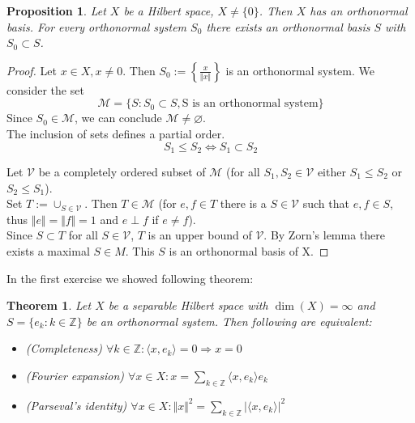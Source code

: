 \documentclass[a4paper, 11pt]{scrreprt}
\newtheorem{prop}[defi]{Proposition}
\newtheorem{theorem}[defi]{Theorem}
\newcommand{\ZZ}{\mathbb{Z}}
\newcommand{\student}[1]{\marginnote{{\normalfont\bf #1}}}
\begin{document}
\student{Dominik}
\begin{prop}
Let $X$ be a Hilbert space, $X \neq \{0\}$. Then $X$ has an orthonormal basis. For every orthonormal system $S_0$ there exists an orthonormal basis $S$ with $S_0 \subset S$.
\end{prop}
\begin{proof}
Let $x \in X, x \neq 0$. Then $S_0 := \left\{ \frac{x}{\Vert x \Vert} \right\}$ is an orthonormal system. We consider the set
\[\mathcal{M} = \{ S: S_0 \subset S, \text{S is an orthonormal system} \}\]
Since $S_0 \in \mathcal{M}$, we can conclude $\mathcal{M} \neq \varnothing$.\\
The inclusion of sets defines a partial order.
\[S_1 \leq S_2 \Leftrightarrow S_1 \subset S_2\]

Let $\mathcal{V}$ be a completely ordered subset of $\mathcal{M}$ (for all $S_1,S_2 \in \mathcal{V}$ either $S_1 \leq S_2$ or $S_2 \leq S_1$).\\
Set $T:= \cup_{S \in \mathcal{V}}$. Then $T \in \mathcal{M}$ (for $e,f \in T$ there is a $S \in \mathcal{V}$ such that $e,f \in S$, thus $\Vert e \Vert = \Vert f \Vert = 1$ and $e \perp f$ if $e \neq f$). \\
Since $S \subset T$ for all $S \in \mathcal{V}$, $T$ is an upper bound of $\mathcal{V}$. By Zorn's lemma there exists a maximal $S \in M$. This $S$ is an orthonormal basis of X.
\end{proof}

\student{Andreas}
In the first exercise we showed following theorem:
\begin{theorem}
Let $X$ be a separable Hilbert space with $\dim(X) = \infty$ and $S = \{e_k: k \in \ZZ \}$ be an orthonormal system. Then following are equivalent:
\begin{itemize}
\item[i)] (Completeness) $\forall k \in \ZZ: \langle x,e_k \rangle = 0 \Rightarrow x = 0$
\item[ii)] (Fourier expansion) $\forall x \in X: x = \sum_{k \in \ZZ} \langle x,e_k \rangle e_k$
\item[iii)] (Parseval's identity) $\forall x \in X: \Vert x \Vert^2 = \sum_{k \in \ZZ} |\langle x,e_k \rangle |^2$
\end{itemize} 
\end{theorem}
\end{document}
